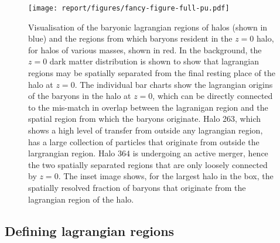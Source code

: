 \begin{figure}
	\centering
	\vspace{1cm}
	\texttt{[image: report/figures/fancy-figure-full-pu.pdf]}
	\caption{
  Visualisation of the baryonic lagrangian regions of halos (shown in blue)
  and the regions from which baryons resident in the $z=0$ halo, for halos of
  various masses, shown in red. In the background, the $z=0$ dark matter
  distribution is shown to show that lagrangian regions may be spatially
  separated from the final resting place of the halo at $z=0$. The individual
  bar charts show the lagrangian origins of the baryons in the halo at $z=0$,
  which can be directly connected to the mis-match in overlap between the
  lagranigan region and the spatial region from which the baryons originate.
  Halo 263, which shows a high level of transfer from outside any lagrangian
  region, has a large collection of particles that originate from outside the
  largrangian region. Halo $364$ is undergoing an active merger, hence the
  two spatially separated regions that are only loosely connected by $z=0$.
  The inset image shows, for the largest halo in the box, the spatially
  resolved fraction of baryons that originate from the lagrangian region of
  the halo.
	}
	\vspace{1cm}
	\label{fig:bigtransferpic}
\end{figure}


\subsection{Defining lagrangian regions}


